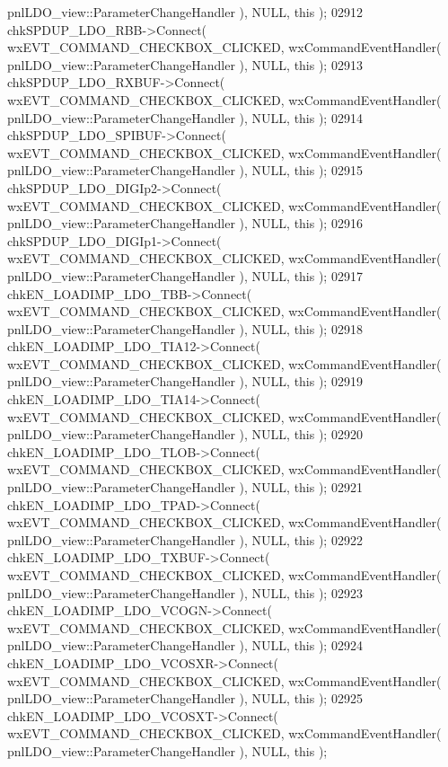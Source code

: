 \begin{DoxyCode}
      pnlLDO_view::ParameterChangeHandler ), NULL, \textcolor{keyword}{this} );
02912     chkSPDUP_LDO_RBB->Connect( wxEVT\_COMMAND\_CHECKBOX\_CLICKED, wxCommandEventHandler( 
      pnlLDO_view::ParameterChangeHandler ), NULL, \textcolor{keyword}{this} );
02913     chkSPDUP_LDO_RXBUF->Connect( wxEVT\_COMMAND\_CHECKBOX\_CLICKED, wxCommandEventHandler( 
      pnlLDO_view::ParameterChangeHandler ), NULL, \textcolor{keyword}{this} );
02914     chkSPDUP_LDO_SPIBUF->Connect( wxEVT\_COMMAND\_CHECKBOX\_CLICKED, wxCommandEventHandler( 
      pnlLDO_view::ParameterChangeHandler ), NULL, \textcolor{keyword}{this} );
02915     chkSPDUP_LDO_DIGIp2->Connect( wxEVT\_COMMAND\_CHECKBOX\_CLICKED, wxCommandEventHandler( 
      pnlLDO_view::ParameterChangeHandler ), NULL, \textcolor{keyword}{this} );
02916     chkSPDUP_LDO_DIGIp1->Connect( wxEVT\_COMMAND\_CHECKBOX\_CLICKED, wxCommandEventHandler( 
      pnlLDO_view::ParameterChangeHandler ), NULL, \textcolor{keyword}{this} );
02917     chkEN_LOADIMP_LDO_TBB->Connect( wxEVT\_COMMAND\_CHECKBOX\_CLICKED, wxCommandEventHandler( 
      pnlLDO_view::ParameterChangeHandler ), NULL, \textcolor{keyword}{this} );
02918     chkEN_LOADIMP_LDO_TIA12->Connect( wxEVT\_COMMAND\_CHECKBOX\_CLICKED, wxCommandEventHandler( 
      pnlLDO_view::ParameterChangeHandler ), NULL, \textcolor{keyword}{this} );
02919     chkEN_LOADIMP_LDO_TIA14->Connect( wxEVT\_COMMAND\_CHECKBOX\_CLICKED, wxCommandEventHandler( 
      pnlLDO_view::ParameterChangeHandler ), NULL, \textcolor{keyword}{this} );
02920     chkEN_LOADIMP_LDO_TLOB->Connect( wxEVT\_COMMAND\_CHECKBOX\_CLICKED, wxCommandEventHandler( 
      pnlLDO_view::ParameterChangeHandler ), NULL, \textcolor{keyword}{this} );
02921     chkEN_LOADIMP_LDO_TPAD->Connect( wxEVT\_COMMAND\_CHECKBOX\_CLICKED, wxCommandEventHandler( 
      pnlLDO_view::ParameterChangeHandler ), NULL, \textcolor{keyword}{this} );
02922     chkEN_LOADIMP_LDO_TXBUF->Connect( wxEVT\_COMMAND\_CHECKBOX\_CLICKED, wxCommandEventHandler( 
      pnlLDO_view::ParameterChangeHandler ), NULL, \textcolor{keyword}{this} );
02923     chkEN_LOADIMP_LDO_VCOGN->Connect( wxEVT\_COMMAND\_CHECKBOX\_CLICKED, wxCommandEventHandler( 
      pnlLDO_view::ParameterChangeHandler ), NULL, \textcolor{keyword}{this} );
02924     chkEN_LOADIMP_LDO_VCOSXR->Connect( wxEVT\_COMMAND\_CHECKBOX\_CLICKED, wxCommandEventHandler( 
      pnlLDO_view::ParameterChangeHandler ), NULL, \textcolor{keyword}{this} );
02925     chkEN_LOADIMP_LDO_VCOSXT->Connect( wxEVT\_COMMAND\_CHECKBOX\_CLICKED, wxCommandEventHandler( 
      pnlLDO_view::ParameterChangeHandler ), NULL, \textcolor{keyword}{this} );

\end{DoxyCode}
